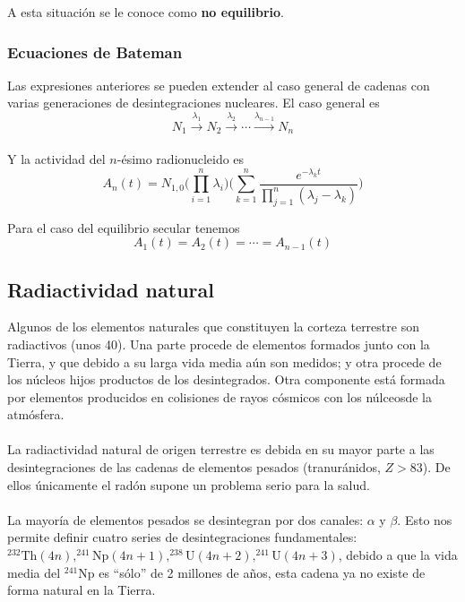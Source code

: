 A esta situación se le conoce como \textbf{no equilibrio}.

\subsubsection{Ecuaciones de Bateman}
Las expresiones anteriores se pueden extender al caso general de cadenas con varias generaciones de desintegraciones nucleares. El caso general es 
\begin{equation}
    N_1\xrightarrow[]{\lambda_1} N_2 \xrightarrow[]{\lambda_2} \cdots \xrightarrow[]{\lambda_{n-1}} N_n
    \label{eq: cadena general}
\end{equation}

Y la actividad del $n$-ésimo radionucleido es 
\begin{equation}    A_n(t)=N_{1,0}\Bigg(\prod_{i=1}^n\lambda_i\Bigg)\Bigg(\sum_{k=1}^n\frac{e^{-\lambda_kt}}{\prod_{j=1}^n\left(\lambda_j-\lambda_k\right)}\Bigg)
\label{eq: actividad del nesimo nucleido de una cadena radiactiva}
\end{equation}

Para el caso del equilibrio secular tenemos $$A_1(t)=A_2(t)=\cdots = A_{n-1}(t)$$

\subsection{Radiactividad natural}
Algunos de los elementos naturales que constituyen la corteza terrestre son radiactivos (unos 40). Una parte procede de elementos formados junto con la Tierra, y que debido a su larga vida media aún son medidos; y otra procede de los núcleos hijos productos de los desintegrados. Otra componente está formada por elementos producidos en colisiones de rayos cósmicos con los núlceosde la atmósfera.\\\\
La radiactividad natural de origen terrestre es debida en su mayor parte a las desintegraciones de las cadenas de elementos pesados (tranuránidos, $Z>83$). De ellos únicamente el radón supone un problema serio para la salud.\\\\
La mayoría de elementos pesados se desintegran por dos canales: $\alpha$ y $\beta$. Esto nos permite definir cuatro series de desintegraciones fundamentales: $^{232}\mathrm{Th}(4n), ^{241}\mathrm{Np}(4n+1), ^{238}\mathrm{U}(4n+2), ^{241}\mathrm{U}(4n+3)$, debido a que la vida media del $^{241}\mathrm{Np}$ es ``sólo'' de 2 millones de años, esta cadena ya no existe de forma natural en la Tierra.
